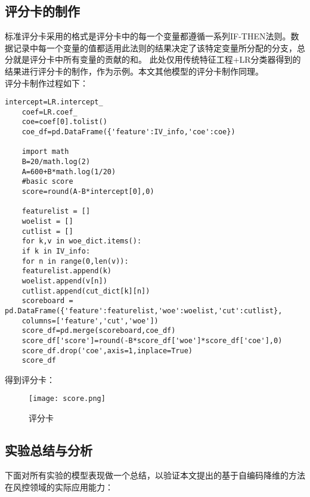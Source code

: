\subsection{评分卡的制作}
标准评分卡采用的格式是评分卡中的每一个变量都遵循一系列IF-THEN法则。数据记录中每一个变量的值都适用此法则的结果决定了该特定变量所分配的分支，总分就是评分卡中所有变量的贡献的和。
此处仅用传统特征工程+LR分类器得到的结果进行评分卡的制作，作为示例。本文其他模型的评分卡制作同理。\cite{ref5} \\
评分卡制作过程如下：
\begin{lstlisting}[frame=shadowbox]
	intercept=LR.intercept_
	coef=LR.coef_
	coe=coef[0].tolist()
	coe_df=pd.DataFrame({'feature':IV_info,'coe':coe})

	import math
	B=20/math.log(2)
	A=600+B*math.log(1/20)
	#basic score
	score=round(A-B*intercept[0],0)

	featurelist = []
	woelist = []
	cutlist = []
	for k,v in woe_dict.items():
	if k in IV_info:
	for n in range(0,len(v)):
	featurelist.append(k)
	woelist.append(v[n])
	cutlist.append(cut_dict[k][n])
	scoreboard = pd.DataFrame({'feature':featurelist,'woe':woelist,'cut':cutlist},
	columns=['feature','cut','woe'])
	score_df=pd.merge(scoreboard,coe_df)
	score_df['score']=round(-B*score_df['woe']*score_df['coe'],0)
	score_df.drop('coe',axis=1,inplace=True)
	score_df
\end{lstlisting}
得到评分卡：
\begin{figure}[H]
	\centering
	\texttt{[image: score.png]}
	\caption{评分卡}
\end{figure}

\subsection{实验总结与分析}

下面对所有实验的模型表现做一个总结，以验证本文提出的基于自编码降维的方法在风控领域的实际应用能力：\\

